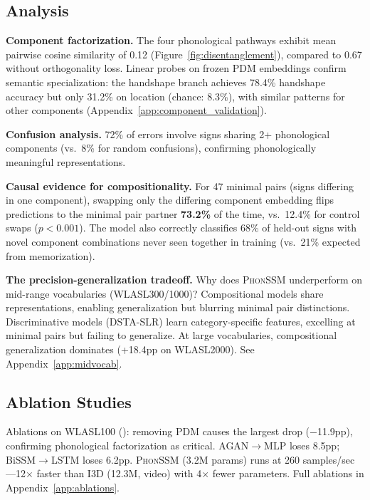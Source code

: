 \documentclass{article}
\theoremstyle{definition}
\theoremstyle{remark}
\newcommand{\phonssm}{\textsc{PhonSSM}}
\begin{document}
\subsection{Analysis}

\textbf{Component factorization.} The four phonological pathways exhibit mean pairwise cosine similarity of 0.12 (Figure~\ref{fig:disentanglement}), compared to 0.67 without orthogonality loss. Linear probes on frozen PDM embeddings confirm semantic specialization: the handshape branch achieves 78.4\% handshape accuracy but only 31.2\% on location (chance: 8.3\%), with similar patterns for other components (Appendix~\ref{app:component_validation}).

\textbf{Confusion analysis.} 72\% of errors involve signs sharing 2+ phonological components (vs.\ 8\% for random confusions), confirming phonologically meaningful representations.

\textbf{Causal evidence for compositionality.} For 47 minimal pairs (signs differing in one component), swapping only the differing component embedding flips predictions to the minimal pair partner \textbf{73.2\%} of the time, vs.\ 12.4\% for control swaps ($p < 0.001$). The model also correctly classifies 68\% of held-out signs with novel component combinations never seen together in training (vs.\ 21\% expected from memorization).

\textbf{The precision-generalization tradeoff.} Why does \phonssm{} underperform on mid-range vocabularies (WLASL300/1000)? Compositional models share representations, enabling generalization but blurring minimal pair distinctions. Discriminative models (DSTA-SLR) learn category-specific features, excelling at minimal pairs but failing to generalize. At large vocabularies, compositional generalization dominates (+18.4pp on WLASL2000). See Appendix~\ref{app:midvocab}.

\subsection{Ablation Studies}

Ablations on WLASL100 (): removing PDM causes the largest drop ($-$11.9pp), confirming phonological factorization as critical. AGAN$\to$MLP loses 8.5pp; BiSSM$\to$LSTM loses 6.2pp. \phonssm{} (3.2M params) runs at 260 samples/sec---12$\times$ faster than I3D (12.3M, video) with 4$\times$ fewer parameters. Full ablations in Appendix~\ref{app:ablations}.
\end{document}
